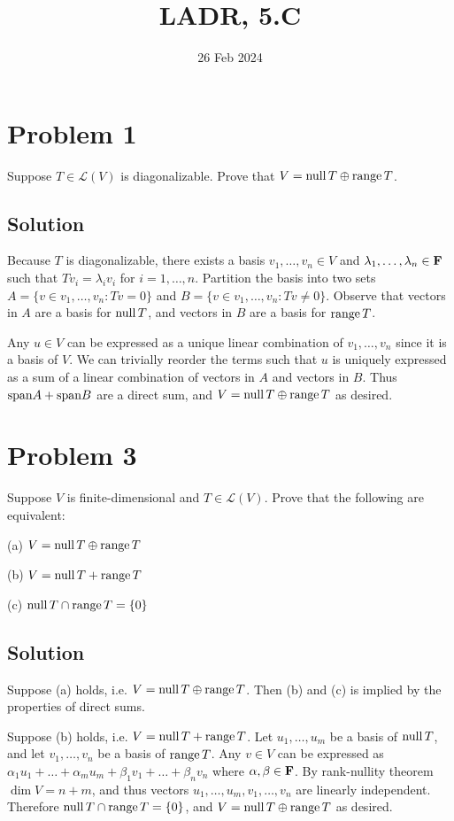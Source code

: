\documentclass{article}
\title{LADR, 5.C}
\date{26 Feb 2024}
\begin{document}
\maketitle

\section*{Problem 1}
Suppose $T\in\mathcal{L}(V)$ is diagonalizable. Prove that $V=\text{null}\, T\oplus\text{range}\, T$.

\subsection*{Solution}
Because $T$ is diagonalizable, there exists a basis $v_1,\ldots,v_n\in V$ and $\lambda_1,\ldots,\lambda_n\in\mathbf{F}$ such that $Tv_i=\lambda_i v_i$ for $i=1,\ldots,n$. Partition the basis into two sets $A=\{v\in v_1,\ldots,v_n:Tv=0\}$ and $B=\{v\in v_1,\ldots,v_n:Tv\neq0\}$. Observe that vectors in $A$ are a basis for $\text{null}\, T$, and vectors in $B$ are a basis for $\text{range}\, T$.

\vs

Any $u\in V$ can be expressed as a unique linear combination of $v_1,\ldots,v_n$ since it is a basis of $V$. We can trivially reorder the terms such that $u$ is uniquely expressed as a sum of a linear combination of vectors in $A$ and vectors in $B$. Thus $\text{span} A+\text{span} B$ are a direct sum, and $V=\text{null}\, T\oplus\text{range}\, T$ as desired.

\section*{Problem 3}
Suppose $V$ is finite-dimensional and $T\in\mathcal{L}(V)$. Prove that the following are equivalent:

\vs

(a) $V=\text{null}\, T\oplus \text{range}\, T$

(b) $V=\text{null}\, T + \text{range}\, T$

(c) $\text{null}\, T\cap\text{range}\, T=\{0\}$

\subsection*{Solution}
Suppose (a) holds, i.e. $V=\text{null}\, T\oplus \text{range}\, T$. Then (b) and (c) is implied by the properties of direct sums.

\vs

Suppose (b) holds, i.e. $V=\text{null}\, T + \text{range}\, T$. Let $u_1,\ldots,u_m$ be a basis of $\text{null}\, T$, and let $v_1,\ldots,v_n$ be a basis of $\text{range}\, T$. Any $v\in V$ can be expressed as $\alpha_1u_1+\ldots+\alpha_m u_m+\beta_1v_1+\ldots+\beta_n v_n$ where $\alpha,\beta\in\mathbf{F}$. By rank-nullity theorem $\dim V=n+m$, and thus vectors $u_1,\ldots,u_m, v_1,\ldots,v_n$ are linearly independent. Therefore $\text{null}\, T\cap\text{range}\, T=\{0\}$, and $V=\text{null}\, T\oplus \text{range}\, T$ as desired.
\end{document}
